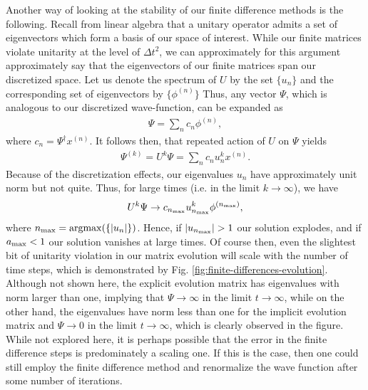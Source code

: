 Another way of looking at the stability of our finite difference methods is the following.
Recall from linear algebra that a unitary operator admits a set of eigenvectors which form a basis of our space of interest.
While our finite matrices violate unitarity at the level of $\Delta t^2$, we can approximately for this argument approximately say that the eigenvectors of our finite matrices span our discretized space.
Let us denote the spectrum of $U$ by the set $\{ u_{n} \}$ and the corresponding set of eigenvectors by $\{ \phi^{(n)} \}$
Thus, any vector $\Psi$, which is analogous to our discretized wave-function, can be expanded as
\begin{align}
    \Psi = \sum_{n} c_{n} \phi^{(n)}
,\end{align}
where $c_{n} = \Psi^{\dagger} x^{(n)}$.
It follows then, that repeated action of $U$ on $\Psi$ yields
\begin{align}
    \Psi^{(k)} = U^{k} \Psi = \sum_{n} c_{n} u_{n}^{k} x^{(n)}
.\end{align}
Because of the discretization effects, our eigenvalues $u_{n}$ have approximately unit norm but not quite.
Thus, for large times (i.e. in the limit $k \rightarrow \infty$), we have
\begin{align}
    U^{k} \Psi \rightarrow c_{n_{\rm max}} u_{n_{\rm max}}^{k} \phi^{(n_{\rm max})}
,\end{align}
where $n_{\rm max} = {\rm argmax}(\{ |u_{n}| \})$.
Hence, if $|u_{n_{\rm max}}| > 1$ our solution explodes, and if $a_{\rm max} < 1$ our solution vanishes at large times.
Of course then, even the slightest bit of unitarity violation in our matrix evolution will scale with the number of time steps, which is demonstrated by Fig. \ref{fig:finite-differences-evolution}.
Although not shown here, the explicit evolution matrix has eigenvalues with norm larger than one, implying that $\Psi \rightarrow \infty$ in the limit $t \rightarrow \infty$, while on the other hand, the eigenvalues have norm less than one for the implicit evolution matrix and $\Psi \rightarrow 0$ in the limit $t \rightarrow \infty$, which is clearly observed in the figure.
While not explored here, it is perhaps possible that the error in the finite difference steps is predominately a scaling one.
If this is the case, then one could still employ the finite difference method and renormalize the wave function after some number of iterations.

    

